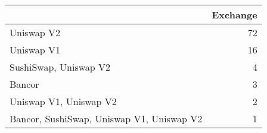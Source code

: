 \begin{tabular}{lr}
\toprule
{} &  Exchange \\
\midrule
Uniswap V2                                &        72 \\
Uniswap V1                                &        16 \\
SushiSwap, Uniswap V2                     &         4 \\
Bancor                                    &         3 \\
Uniswap V1, Uniswap V2                    &         2 \\
Bancor, SushiSwap, Uniswap V1, Uniswap V2 &         1 \\
\bottomrule
\end{tabular}

